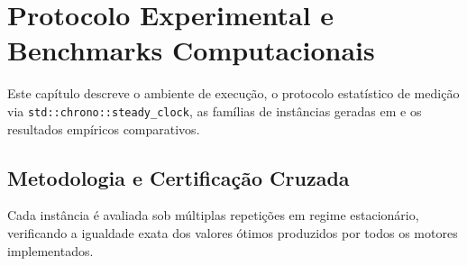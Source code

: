 \chapter{Protocolo Experimental e Benchmarks Computacionais}\label{sec:benchmarks}

Este capítulo descreve o ambiente de execução, o protocolo estatístico de medição via \lstinline{std::chrono::steady_clock}, as famílias de instâncias geradas em  e os resultados empíricos comparativos.

\section{Metodologia e Certificação Cruzada}

Cada instância é avaliada sob múltiplas repetições em regime estacionário, verificando a igualdade exata dos valores ótimos produzidos por todos os motores implementados.

